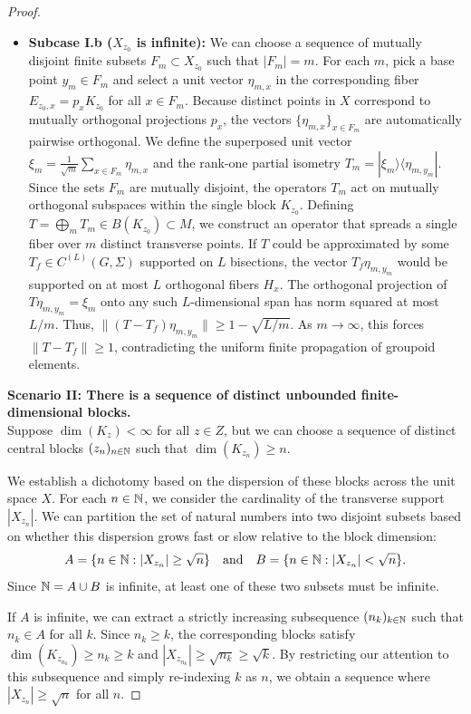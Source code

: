 \begin{proof}
\begin{itemize}
    \item \textbf{Subcase I.b ($X_{z_0}$ is infinite):} We can choose a sequence of mutually disjoint finite subsets $F_m \subset X_{z_0}$ such that $|F_m| = m$. For each $m$, pick a base point $y_m \in F_m$ and select a unit vector $\eta_{m,x}$ in the corresponding fiber $E_{z_0, x} = p_x K_{z_0}$ for all $x \in F_m$. Because distinct points in $X$ correspond to mutually orthogonal projections $p_x$, the vectors $\{\eta_{m,x}\}_{x \in F_m}$ are automatically pairwise orthogonal. We define the superposed unit vector $\xi_m = \frac{1}{\sqrt{m}} \sum_{x \in F_m} \eta_{m,x}$ and the rank-one partial isometry $T_m = |\xi_m\rangle\langle\eta_{m,y_m}|$. Since the sets $F_m$ are mutually disjoint, the operators $T_m$ act on mutually orthogonal subspaces within the single block $K_{z_0}$. 
    Defining $T = \bigoplus_m T_m \in B(K_{z_0}) \subset M$, we construct an operator that spreads a single fiber over $m$ distinct transverse points. 
    If $T$ could be approximated by some $T_f \in C^{(L)}(G,\Sigma)$ supported on $L$ bisections, the vector $T_f \eta_{m,y_m}$ would be supported on at most $L$ orthogonal fibers $H_x$. The orthogonal projection of $T \eta_{m,y_m} = \xi_m$ onto any such $L$-dimensional span has norm squared at most $L/m$. Thus, $\|(T - T_f)\eta_{m,y_m}\| \ge 1 - \sqrt{L/m}$. As $m \to \infty$, this forces $\|T - T_f\| \ge 1$, contradicting the uniform finite propagation of groupoid elements.
\end{itemize}

\medskip
\noindent
\textbf{Scenario II: There is a sequence of distinct unbounded finite-dimensional blocks.} \\
Suppose $\dim(K_z) < \infty$ for all $z \in Z$, but we can choose a sequence of distinct central blocks $(z_n)_{n \in \mathbb N}$ such that $\dim(K_{z_n}) \ge n$.

We establish a dichotomy based on the dispersion of these blocks across the unit space $X$. For each $n \in \mathbb N$, we consider the cardinality of the transverse support $|X_{z_n}|$. We can partition the set of natural numbers into two disjoint subsets based on whether this dispersion grows fast or slow relative to the block dimension:
\[
A = \{n \in \mathbb N : |X_{z_n}| \ge \sqrt{n}\} \quad \text{and} \quad B = \{n \in \mathbb N : |X_{z_n}| < \sqrt{n}\}.
\]
Since $\mathbb N = A \cup B$ is infinite, at least one of these two subsets must be infinite. 

If $A$ is infinite, we can extract a strictly increasing subsequence $(n_k)_{k \in \mathbb N}$ such that $n_k \in A$ for all $k$. Since $n_k \ge k$, the corresponding blocks satisfy $\dim(K_{z_{n_k}}) \ge n_k \ge k$ and $|X_{z_{n_k}}| \ge \sqrt{n_k} \ge \sqrt{k}$. By restricting our attention to this subsequence and simply re-indexing $k$ as $n$, we obtain a sequence where $|X_{z_n}| \ge \sqrt{n}$ for all $n$. 


\end{proof}
